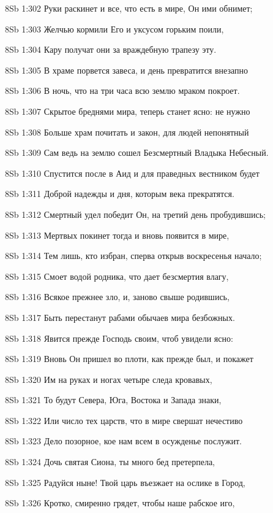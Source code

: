 \vs 8Sb 1:302 Руки раскинет и все, что есть в мире, Он ими обнимет; 

\vs 8Sb 1:303 Желчью кормили Его и уксусом горьким поили, 

\vs 8Sb 1:304 Кару получат они за враждебную трапезу эту.

\vs 8Sb 1:305 В храме порвется завеса, и день превратится внезапно 

\vs 8Sb 1:306 В ночь, что на три часа всю землю мраком покроет. 

\vs 8Sb 1:307 Скрытое бреднями мира, теперь станет ясно: не нужно 

\vs 8Sb 1:308 Больше храм почитать и закон, для людей непонятный  

\vs 8Sb 1:309 Сам ведь на землю сошел Безсмертный Владыка Небесный.

\vs 8Sb 1:310 Спустится после в Аид и для праведных вестником будет 

\vs 8Sb 1:311 Доброй надежды и дня, которым века прекратятся. 

\vs 8Sb 1:312 Смертный удел победит Он, на третий день пробудившись;

\vs 8Sb 1:313 Мертвых покинет тогда и вновь появится в мире, 

\vs 8Sb 1:314 Тем лишь, кто избран, сперва открыв воскресенья начало;

\vs 8Sb 1:315 Смоет водой родника, что дает безсмертия влагу, 

\vs 8Sb 1:316 Всякое прежнее зло, и, заново свыше родившись, 

\vs 8Sb 1:317 Быть перестанут рабами обычаев мира безбожных. 

\vs 8Sb 1:318 Явится прежде Господь своим, чтоб увидели ясно: 

\vs 8Sb 1:319 Вновь Он пришел во плоти, как прежде был, и покажет

\vs 8Sb 1:320 Им на руках и ногах четыре следа кровавых, 

\vs 8Sb 1:321 То будут Севера, Юга, Востока и Запада знаки, 

\vs 8Sb 1:322 Или число тех царств, что в мире свершат нечестиво 

\vs 8Sb 1:323 Дело позорное, кое нам всем в осужденье послужит.

\vs 8Sb 1:324 Дочь святая Сиона, ты много бед претерпела, 

\vs 8Sb 1:325 Радуйся ныне! Твой царь въезжает на ослике в Город, 

\vs 8Sb 1:326 Кротко, смиренно грядет, чтобы наше рабское иго, 

